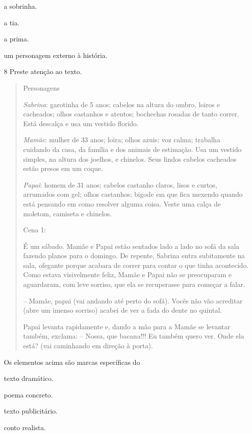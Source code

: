 \begin{escolha}
\item a sobrinha.

\item a tia.

\item a prima.

\item um personagem externo à história.
\end{escolha}


\num{8} Preste atenção ao texto.

\begin{quote}
Personagens

\emph{Sabrina}: garotinha de 5 anos; cabelos na altura do ombro, loiros
e cacheados; olhos castanhos e atentos; bochechas rosadas de tanto
correr. Está descalça e usa um vestido florido.

\emph{Mamãe}: mulher de 33 anos; loira; olhos azuis; voz calma; trabalha
cuidando da casa, da família e dos animais de estimação. Usa um vestido
simples, na altura dos joelhos, e chinelos. Seus lindos cabelos
cacheados estão presos em um coque.

\emph{Papai}: homem de 31 anos; cabelos castanho claros, lisos e curtos,
arrumados com gel; olhos castanhos; bigode em que fica mexendo quando
está pensando em como resolver alguma coisa. Veste uma calça de moletom,
camiseta e chinelos.

Cena 1:

É um sábado. Mamãe e Papai estão sentados lado a lado no sofá da sala
fazendo planos para o domingo. De repente, Sabrina entra subitamente na
sala, ofegante porque acabara de correr para contar o que tinha
acontecido. Como estava visivelmente feliz, Mamãe e Papai não se
preocuparam e aguardaram, com leve sorriso, que ela se recuperasse para
começar a falar.

-- Mamãe, papai (vai andando até perto do sofá). Vocês não vão acreditar
(abre um imenso sorriso) acabei de ver a fada do dente no quintal.

Papai levanta rapidamente e, dando a mão para a Mamãe se levantar
também, exclama: -- Nossa, que bacana!!! Eu também quero ver. Onde ela
está? (vai caminhando em direção à porta).

\end{quote}

Os elementos acima são marcas específicas do

\begin{escolha}
\item texto dramático.

\item poema concreto.

\item texto publicitário.

\item conto realista.
\end{escolha}

